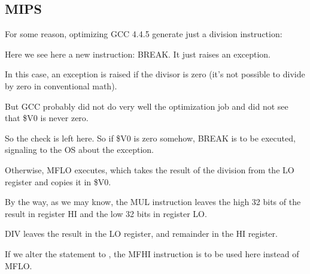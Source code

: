 ﻿\subsection{MIPS}

For some reason, optimizing GCC 4.4.5 generate just a division instruction:



Here we see here a new instruction: BREAK. It just raises an exception.

In this case, an exception is raised if the divisor is zero (it's not possible to divide by zero 
in conventional math).

But GCC probably did not do very well the optimization job and did not see that \$V0 is never zero.

So the check is left here.
So if \$V0 is zero somehow, BREAK is to be executed, signaling to the \ac{OS} about the exception.

Otherwise, MFLO executes, which takes the result of the division from the LO register and copies it in \$V0.

By the way, as we may know, the MUL instruction leaves the high 32 bits of 
the result in register HI and the low 32 bits in register LO.

DIV leaves the result in the LO register, and remainder in the HI register.

If we alter the statement to , 
the MFHI instruction is to be used here instead of MFLO.

